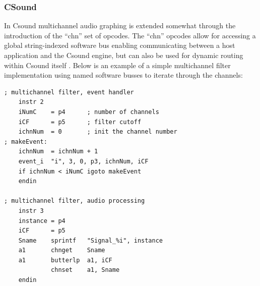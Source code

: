 \documentclass[twoside,a4paper]{article}
\begin{document}

\subsubsection{CSound} %

In Csound multichannel audio graphing is extended somewhat through the introduction of the ``chn'' set of opcodes.
The ``chn'' opcodes allow for accessing a global string-indexed software bus enabling communicating between a host application and the Csound engine, but can also be used for dynamic routing within Csound itself \cite{Yi:2006}.
Below is an example of  a simple multichannel filter implementation using named software busses to iterate through the channels:


\begin{lstlisting}
; multichannel filter, event handler 
    instr 2 
    iNumC    = p4      ; number of channels 
    iCF      = p5      ; filter cutoff 
    ichnNum  = 0       ; init the channel number 
; makeEvent:
    ichnNum  = ichnNum + 1
    event_i  "i", 3, 0, p3, ichnNum, iCF
    if ichnNum < iNumC igoto makeEvent
    endin

; multichannel filter, audio processing
    instr 3    
    instance = p4
    iCF      = p5
    Sname    sprintf   "Signal_%i", instance        
    a1       chnget    Sname
    a1       butterlp  a1, iCF
             chnset    a1, Sname
    endin
\end{lstlisting}  
\end{document}
